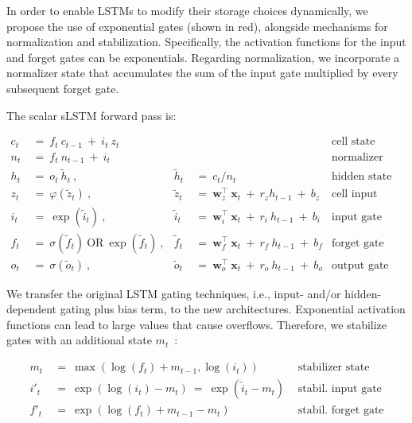 In order to enable LSTMs to modify their storage choices dynamically, we propose the use of exponential gates (shown in red), alongside mechanisms for normalization and stabilization. Specifically, the activation functions for the input and forget gates can be exponentials. Regarding normalization, we incorporate a normalizer state that accumulates the sum of the input gate multiplied by every subsequent forget gate.

The scalar sLSTM forward pass is:

\begin{align}
\label{eq:slstmforward}
c_t \ &= \  f_t \ c_{t-1} \ + \ i_t \ z_t & & 
 &\text{cell state} \\
n_t \ &= \  f_t \ n_{t-1} \ + \ i_t  & & 
 &\text{normalizer state} \\
h_t \ &= \ o_t \ \tilde{h}_t \ ,
  &\tilde{h}_t \ &= \ c_t / n_t
&\text{hidden state} \\
z_t \ &= \ \varphi \left( \tilde{z}_t \right) \ , 
  &\tilde{z}_t \ &=  \ \mathbf{w}^\top_{z} \ \mathbf{x}_t \ + \
  r_{z}  h_{t-1} \ + \  b_{z}
  &\text{cell input} \\
i_t \ &= \ \!\exp \left( \tilde{i}_t  \right) \ , 
  &\tilde{i}_t \ &= \ \mathbf{w}^\top_{i} \ \mathbf{x}_t \ + \
  r_{i}  \ h_{t-1} \ + \  b_{i}
  &\text{input gate} \\
f_t \ &= \ \sigma \left(  \tilde{f}_t \right) \ \text{OR} \
\!\exp \left(  \tilde{f}_t \right) \ ,
  &\tilde{f}_t \ &= \ \mathbf{w}^\top_{f} \ \mathbf{x}_t  \ + \
  r_{f}  \ h_{t-1} \ + \  b_{f}
  &\text{forget gate} \\
o_t \ &= \ \sigma \left( \tilde{o}_t \right) \ , 
  &\tilde{o}_t  \ &= \ \mathbf{w}^\top_{o} \ \mathbf{x}_t \ + \
  r_{o}  \ h_{t-1} \ + \  b_{o}
  &\text{output gate} 
\end{align}

We transfer the original LSTM gating techniques, i.e., input- and/or hidden-dependent gating plus bias term, to the new architectures. Exponential activation functions can lead to large values that cause overflows. Therefore, we stabilize gates with an additional state \mbox{$m_t$~\citep{Milakov:18arxiv}}:

\begin{align}
\label{eq:slstmstabil}
m_t \ &= \ \max \left( \log ( f_t ) + m_{t-1} , \log ( i_t ) \right) &\text{stabilizer state} \\
i'_t \ &= \ \!\exp \left( \log \left ( i_t \right) - m_t \right) \ = \ \!\exp \left( \tilde{i}_t - m_t \right) \ \, 
  &\text{stabil. input gate} \\
f'_t \ &= \ \!\exp \left( \log \left( f_t \right) + m_{t-1} - m_t \right) \ \, 
  &\text{stabil. forget gate}
\end{align}

